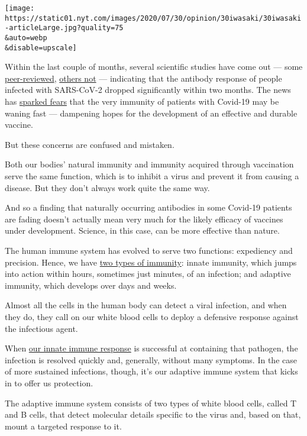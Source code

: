 \texttt{[image: https://static01.nyt.com/images/2020/07/30/opinion/30iwasaki/30iwasaki-articleLarge.jpg?quality=75\\\&auto=webp\\\&disable=upscale]}

Within the last couple of months, several scientific studies have come
out --- some
\href{https://www.nature.com/articles/s41591-020-0965-6}{peer-reviewed},
\href{https://www.medrxiv.org/content/10.1101/2020.07.09.20148429v1.full.pdf}{others
not} --- indicating that the antibody response of people infected with
SARS-CoV-2 dropped significantly within two months. The news has
\href{https://www.sfchronicle.com/health/article/With-coronavirus-antibodies-fading-fast-focus-15414533.php}{sparked
fears} that the very immunity of patients with Covid-19 may be waning
fast --- dampening hopes for the development of an effective and durable
vaccine.

But these concerns are confused and mistaken.

Both our bodies' natural immunity and immunity acquired through
vaccination serve the same function, which is to inhibit a virus and
prevent it from causing a disease. But they don't always work quite the
same way.

And so a finding that naturally occurring antibodies in some Covid-19
patients are fading doesn't actually mean very much for the likely
efficacy of vaccines under development. Science, in this case, can be
more effective than nature.

The human immune system has evolved to serve two functions: expediency
and precision. Hence, we have
\href{https://www.nature.com/articles/ni.3123}{two types of immunity}:
innate immunity, which jumps into action within hours, sometimes just
minutes, of an infection; and adaptive immunity, which develops over
days and weeks.

Almost all the cells in the human body can detect a viral infection, and
when they do, they call on our white blood cells to deploy a defensive
response against the infectious agent.

When \href{https://www.ncbi.nlm.nih.gov/pmc/articles/PMC5480291/}{our
innate immune response} is successful at containing that pathogen, the
infection is resolved quickly and, generally, without many symptoms. In
the case of more sustained infections, though, it's our adaptive immune
system that kicks in to offer us protection.

The adaptive immune system consists of two types of white blood cells,
called T and B cells, that detect molecular details specific to the
virus and, based on that, mount a targeted response to it.

